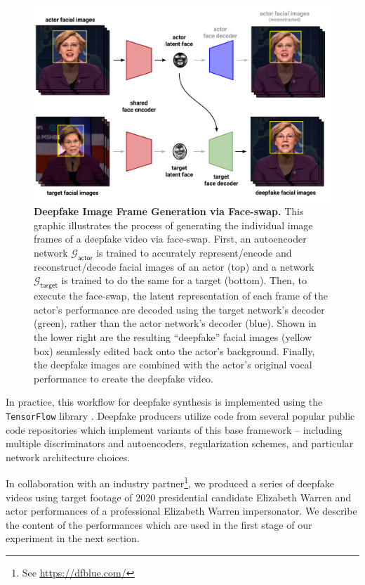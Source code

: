 \documentclass[12pt,letterpaper]{article}
\begin{document}
\begin{figure}[h]
    \centering
    \includegraphics[width=\textwidth]{faceswap_illustration.pdf}
    \caption{\textbf{Deepfake Image Frame Generation via Face-swap.} This graphic illustrates the process of generating the individual image frames of a deepfake video via face-swap. First, an autoencoder network $\mathcal{G}_{\textsf{actor}}$ is trained to accurately represent/encode and reconstruct/decode facial images of an actor (top) and a network $\mathcal{G}_{\textsf{target}}$ is trained to do the same for a target (bottom). Then, to execute the face-swap, the latent representation of each frame of the actor's performance are decoded using the target network's decoder (green), rather than the actor network's decoder (blue). Shown in the lower right are the resulting ``deepfake'' facial images (yellow box) seamlessly edited back onto the actor's background. Finally, the deepfake images are combined with the actor's original vocal performance to create the deepfake video. }
    \label{fig:pipeline}
\end{figure}

In practice, this workflow for deepfake synthesis is implemented using the \texttt{TensorFlow} library \citep{abadi2016tensorflow}. Deepfake producers utilize code from several popular public code repositories which implement variants of this base framework -- including multiple discriminators and autoencoders, regularization schemes, and particular network architecture choices.

In collaboration with an industry partner\footnote{See \url{https://dfblue.com/}}, we produced a series of deepfake videos using target footage of 2020 presidential candidate Elizabeth Warren and actor performances of a professional Elizabeth Warren impersonator. We describe the content of the performances which are used in the first stage of our experiment in the next section.
\end{document}
